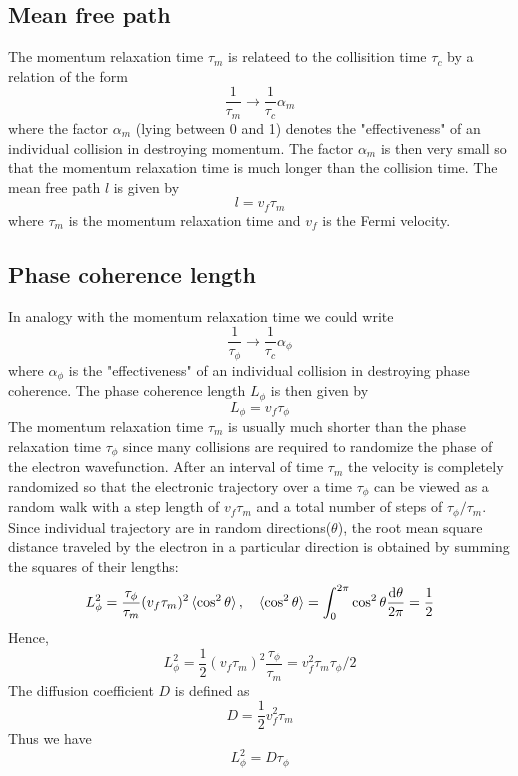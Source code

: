 \documentclass[11pt,a4paper]{book}
\theoremstyle{plain}
\theoremstyle{definition}
\theoremstyle{remark}
\begin{document}
\subsection{Mean free path}
The momentum relaxation time $\tau_m$ is relateed to the collisition time $\tau_c$ by a relation of the form
\begin{equation}
    \frac{1}{\tau_m} \rightarrow \frac{1}{\tau_c} \alpha_m
\end{equation}
where the factor $\alpha_m$ (lying between 0 and 1) denotes the "effectiveness" of an individual collision in destroying momentum. The factor $\alpha_m$ is then very small so that the momentum relaxation time is much longer than the collision time. The mean free path $l$ is given by
\begin{equation}
    l = v_f \tau_m
\end{equation}
where $\tau_m$ is the momentum relaxation time and $v_f$ is the Fermi velocity.
\subsection{Phase coherence length}
In analogy with the momentum relaxation time we could write
\begin{equation}
    \frac{1}{\tau_\phi} \rightarrow \frac{1}{\tau_c} \alpha_\phi
\end{equation}
where $\alpha_\phi$ is the "effectiveness" of an individual collision in destroying phase coherence. The phase coherence length $L_\phi$ is then given by
\begin{equation}
    L_\phi = v_f \tau_\phi
\end{equation}
The momentum relaxation time $\tau_m$ is usually much shorter than the phase relaxation time $\tau_\phi$ since many collisions are required to randomize the phase of the electron wavefunction. After an interval of time $\tau_m$ the velocity is completely randomized so that the electronic trajectory over a time $\tau_\phi$ can be viewed as a random walk with a step length of $v_f \tau_m$ and a total number of steps of $\tau_\phi/\tau_m$. Since individual trajectory are in random directions($\theta$), the root mean square distance traveled by the electron in a particular direction is obtained by summing the squares of their lengths:
\begin{equation}
    L_\phi^2 = \frac{\tau_\phi}{\tau_m}(v_f\tau_m)^2\braket{\cos^2 \theta}, \quad \braket{\cos^2 \theta} = \int_0^{2 \pi} \cos^2 \theta \frac{\dd \theta}{2 \pi} = \frac{1}{2}
\end{equation}
Hence,
\begin{equation}
    L_\phi^2 = \frac{1}{2}(v_f \tau_m)^2\frac{\tau_\phi}{\tau_m} = v_f^2 \tau_m \tau_\phi/2
\end{equation}
The diffusion coefficient $D$ is defined as
\begin{equation}
    D = \frac{1}{2} v_f^2 \tau_m
\end{equation}
Thus we have
\begin{equation}
    L_\phi^2 = D \tau_\phi
\end{equation}
\end{document}
